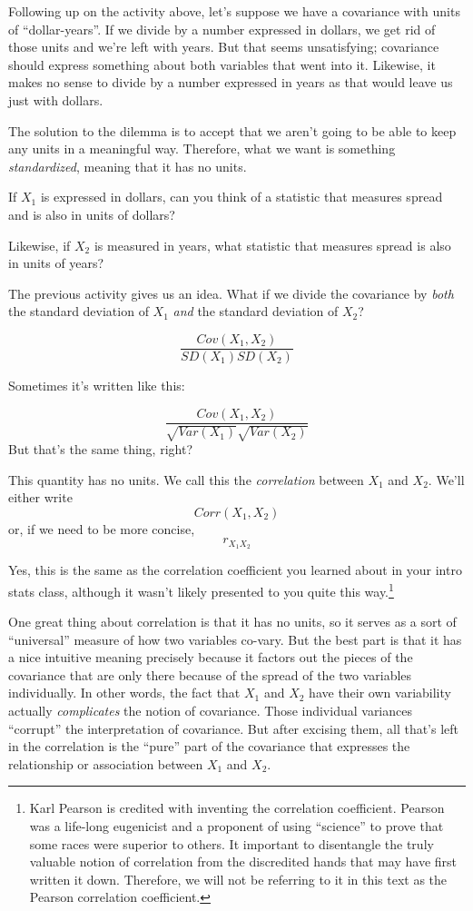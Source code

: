 \documentclass[
]{book}
\begin{document}
Following up on the activity above, let's suppose we have a covariance with units of ``dollar-years''. If we divide by a number expressed in dollars, we get rid of those units and we're left with years. But that seems unsatisfying; covariance should express something about both variables that went into it. Likewise, it makes no sense to divide by a number expressed in years as that would leave us just with dollars.

The solution to the dilemma is to accept that we aren't going to be able to keep any units in a meaningful way. Therefore, what we want is something \emph{standardized}, meaning that it has no units.

If \(X_{1}\) is expressed in dollars, can you think of a statistic that measures spread and is also in units of dollars?

Likewise, if \(X_{2}\) is measured in years, what statistic that measures spread is also in units of years?

The previous activity gives us an idea. What if we divide the covariance by \emph{both} the standard deviation of \(X_{1}\) \emph{and} the standard deviation of \(X_{2}\)?

\[
\frac{Cov(X_{1},X_{2})}{SD(X_{1}) SD(X_{2})}
\]

Sometimes it's written like this:

\[
\frac{Cov(X_{1},X_{2})}{\sqrt{Var(X_{1})} \sqrt{Var(X_{2})}}
\]
But that's the same thing, right?

This quantity has no units. We call this the \emph{correlation} between \(X_{1}\) and \(X_{2}\). We'll either write
\[
Corr(X_{1}, X_{2})
\]
or, if we need to be more concise,
\[
r_{X_{1}X_{2}}
\]

Yes, this is the same as the correlation coefficient you learned about in your intro stats class, although it wasn't likely presented to you quite this way.\footnote{Karl Pearson is credited with inventing the correlation coefficient. Pearson was a life-long eugenicist and a proponent of using ``science'' to prove that some races were superior to others. It important to disentangle the truly valuable notion of correlation from the discredited hands that may have first written it down. Therefore, we will not be referring to it in this text as the Pearson correlation coefficient.}

One great thing about correlation is that it has no units, so it serves as a sort of ``universal'' measure of how two variables co-vary. But the best part is that it has a nice intuitive meaning precisely because it factors out the pieces of the covariance that are only there because of the spread of the two variables individually. In other words, the fact that \(X_{1}\) and \(X_{2}\) have their own variability actually \emph{complicates} the notion of covariance. Those individual variances ``corrupt'' the interpretation of covariance. But after excising them, all that's left in the correlation is the ``pure'' part of the covariance that expresses the relationship or association between \(X_{1}\) and \(X_{2}\).
\end{document}
